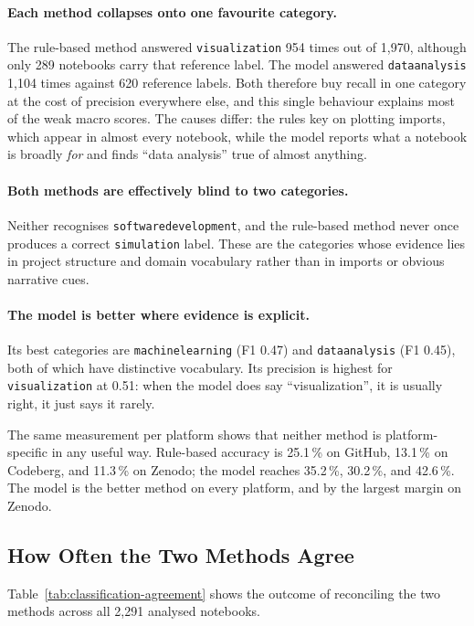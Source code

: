 \paragraph{Each method collapses onto one favourite category.} The rule-based method answered \texttt{visualization} 954 times out of 1{,}970, although only 289 notebooks carry that reference label. The model answered \texttt{data\ub analysis} 1{,}104 times against 620 reference labels. Both therefore buy recall in one category at the cost of precision everywhere else, and this single behaviour explains most of the weak macro scores. The causes differ: the rules key on plotting imports, which appear in almost every notebook, while the model reports what a notebook is broadly \emph{for} and finds ``data analysis'' true of almost anything.

\paragraph{Both methods are effectively blind to two categories.} Neither recognises \texttt{software\ub development}, and the rule-based method never once produces a correct \texttt{simulation} label. These are the categories whose evidence lies in project structure and domain vocabulary rather than in imports or obvious narrative cues.

\paragraph{The model is better where evidence is explicit.} Its best categories are \texttt{machine\ub learning} (F1 0.47) and \texttt{data\ub analysis} (F1 0.45), both of which have distinctive vocabulary. Its precision is highest for \texttt{visualization} at 0.51: when the model does say ``visualization'', it is usually right, it just says it rarely.

The same measurement per platform shows that neither method is platform-specific in any useful way. Rule-based accuracy is 25.1\,\% on GitHub, 13.1\,\% on Codeberg, and 11.3\,\% on Zenodo; the model reaches 35.2\,\%, 30.2\,\%, and 42.6\,\%. The model is the better method on every platform, and by the largest margin on Zenodo.

\subsection{How Often the Two Methods Agree}

Table~\ref{tab:classification-agreement} shows the outcome of reconciling the two methods across all 2{,}291 analysed notebooks.

